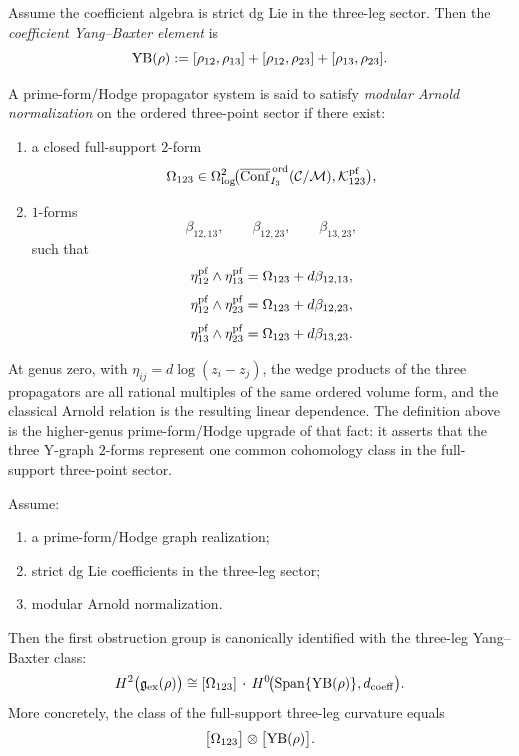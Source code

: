 \begin{definition}
\label{def:strict-coefficient-yb-element}
Assume the coefficient algebra is strict dg Lie in the three-leg sector.
Then the \emph{coefficient Yang--Baxter element} is
\[
\mathrm{YB}(\rho)
:=
[\rho_{12},\rho_{13}]
+
[\rho_{12},\rho_{23}]
+
[\rho_{13},\rho_{23}].
\]
\end{definition}

\begin{definition}
\label{def:modular-arnold-normalization}
A prime-form/Hodge propagator system is said to satisfy \emph{modular Arnold normalization} on the
ordered three-point sector if there exist:
\begin{enumerate}
\item a closed full-support $2$-form
\[
\Omega_{123}\in
\Omega^2_{\log}\!\bigl(\overline{\operatorname{Conf}}^{\,\mathrm{ord}}_{I_3}(\mathcal C/\mathcal M),
\mathcal K^{\mathrm{pf}}_{123}\bigr),
\]
\item $1$-forms
\[
\beta_{12,13},\qquad \beta_{12,23},\qquad \beta_{13,23},
\]
such that
\[
\eta_{12}^{\mathrm{pf}}\wedge \eta_{13}^{\mathrm{pf}}
=
\Omega_{123}+d\beta_{12,13},
\]
\[
\eta_{12}^{\mathrm{pf}}\wedge \eta_{23}^{\mathrm{pf}}
=
\Omega_{123}+d\beta_{12,23},
\]
\[
\eta_{13}^{\mathrm{pf}}\wedge \eta_{23}^{\mathrm{pf}}
=
\Omega_{123}+d\beta_{13,23}.
\]
\end{enumerate}
\end{definition}

\begin{remark}
At genus zero, with $\eta_{ij}=d\log(z_i-z_j)$, the wedge products of the three propagators are all
rational multiples of the same ordered volume form, and the classical Arnold relation is the resulting
linear dependence. The definition above is the higher-genus prime-form/Hodge upgrade of that fact:
it asserts that the three Y-graph $2$-forms represent one common cohomology class in the full-support
three-point sector.
\end{remark}

\begin{theorem}
\label{thm:modular-yang-baxter-identification-of-H2}
Assume:
\begin{enumerate}
\item
a prime-form/Hodge graph realization;
\item
strict dg Lie coefficients in the three-leg sector;
\item
modular Arnold normalization.
\end{enumerate}
Then the first obstruction group is canonically identified with the three-leg Yang--Baxter class:
\[
H^2\bigl(\mathfrak g_{\mathrm{ex}}(\rho)\bigr)
\cong
[\Omega_{123}]\,\cdot\,
H^0\!\bigl(\operatorname{Span}\{\mathrm{YB}(\rho)\},d_{\mathrm{coeff}}\bigr).
\]
More concretely, the class of the full-support three-leg curvature equals
\[
\bigl[\Omega_{123}\bigr]\otimes \bigl[\mathrm{YB}(\rho)\bigr].
\]
\end{theorem}

